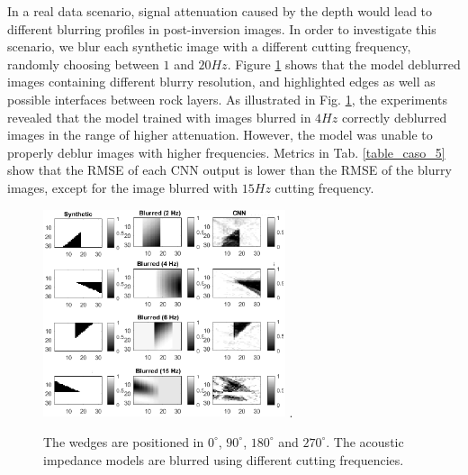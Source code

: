 \documentclass[conference]{IEEEtran}
\begin{document}
In a real data scenario, signal attenuation caused by the depth would lead to
different blurring profiles in post-inversion images.
In order to investigate this scenario, we blur each synthetic image with a different
cutting frequency, randomly choosing between $1$ and $20 Hz$. 
Figure \ref{fig_scenario3} shows that the model deblurred images containing different blurry resolution, and
highlighted edges as well as possible interfaces between rock layers.
As illustrated in Fig. \ref{fig_scenario3}, the experiments revealed that the model trained with images blurred in $4Hz$
correctly deblurred images in the range of higher attenuation. However, the model was unable to properly deblur images with higher frequencies.
Metrics in Tab. \ref{table_caso_5} show that the RMSE of each CNN output is lower than the RMSE of the blurry images, except for the image blurred with $15Hz$ cutting frequency.
\begin{figure}[!t]
	\centering
	\includegraphics[width=2.8in]{Figs/teste3}
	\DeclareGraphicsExtensions.
	\caption{The wedges are positioned in $0^{\circ}$, $90^{\circ}$, $180^{\circ}$ and $270^{\circ}$. The acoustic impedance models are blurred using different cutting frequencies.}
	\label{fig_scenario3}
\end{figure}
\end{document}
